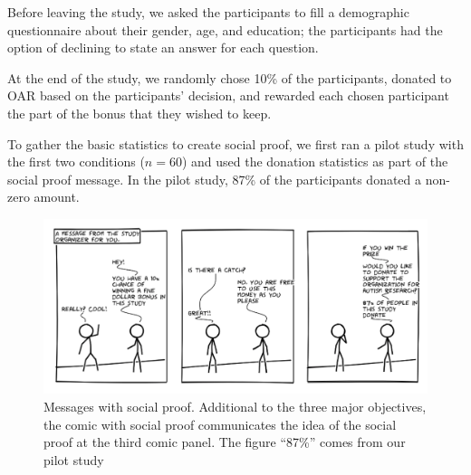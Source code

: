 Before leaving the study, we asked the participants to fill a demographic questionnaire about their gender, age, and education; the participants had the option of declining to state an answer for each question.

At the end of the study, we randomly chose 10\% of the participants, donated to OAR based on the participants' decision, and rewarded each chosen participant the part of the bonus that they wished to keep.

To gather the basic statistics to create social proof, we first ran a pilot study with the first two conditions ($n=60$) and used the donation statistics as part of the social proof message. In the pilot study, 87\% of the participants donated a non-zero amount. 



\begin{figure}[bt]
    \centering
    \includegraphics[width=\columnwidth]{./figures/social_proof.png}
    \caption{Messages with social proof. Additional to the three major objectives, the comic with social proof communicates the idea of the social proof at the third comic panel. The figure ``87\%'' comes from our pilot study}
    \label{fig:basic three comic social proof}
\end{figure}

